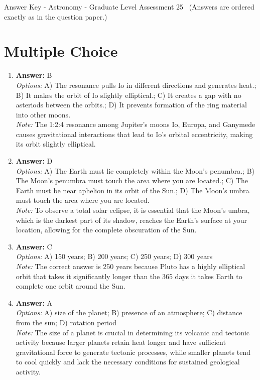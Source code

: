 \documentclass[12pt]{article}
\begin{document}
\begin{center}
Answer Key - Astronomy - Graduate Level Assessment 25 \
\small (Answers are ordered exactly as in the question paper.)
\end{center}

\section*{Multiple Choice}
\begin{enumerate}[label=\arabic*.]
\item \textbf{Answer:} B
\\ \textit{Options:} A) The resonance pulls Io in different directions and generates heat.; B) It makes the orbit of Io slightly elliptical.; C) It creates a gap with no asteriods between the orbits.; D) It prevents formation of the ring material into other moons.
\\ \textit{Note:} The 1:2:4 resonance among Jupiter's moons Io, Europa, and Ganymede causes gravitational interactions that lead to Io's orbital eccentricity, making its orbit slightly elliptical.
\item \textbf{Answer:} D
\\ \textit{Options:} A) The Earth must lie completely within the Moon's penumbra.; B) The Moon's penumbra must touch the area where you are located.; C) The Earth must be near aphelion in its orbit of the Sun.; D) The Moon's umbra must touch the area where you are located.
\\ \textit{Note:} To observe a total solar eclipse, it is essential that the Moon's umbra, which is the darkest part of its shadow, reaches the Earth's surface at your location, allowing for the complete obscuration of the Sun.
\item \textbf{Answer:} C
\\ \textit{Options:} A) 150 years; B) 200 years; C) 250 years; D) 300 years
\\ \textit{Note:} The correct answer is 250 years because Pluto has a highly elliptical orbit that takes it significantly longer than the 365 days it takes Earth to complete one orbit around the Sun.
\item \textbf{Answer:} A
\\ \textit{Options:} A) size of the planet; B) presence of an atmosphere; C) distance from the sun; D) rotation period
\\ \textit{Note:} The size of a planet is crucial in determining its volcanic and tectonic activity because larger planets retain heat longer and have sufficient gravitational force to generate tectonic processes, while smaller planets tend to cool quickly and lack the necessary conditions for sustained geological activity.

\end{enumerate}
\end{document}
